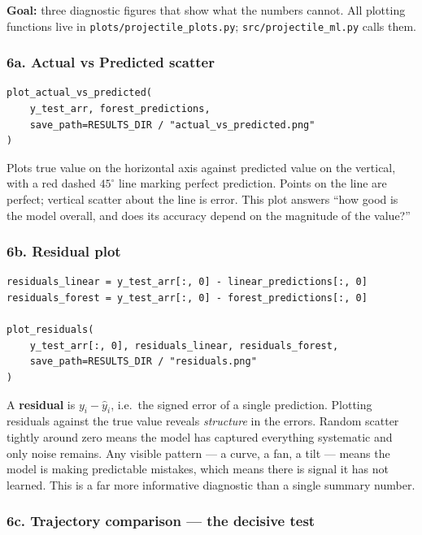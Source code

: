 \documentclass[11pt,a4paper]{article}
\begin{document}
\textbf{Goal:} three diagnostic figures that show what the numbers cannot. All plotting functions
live in \texttt{plots/projectile\_plots.py}; \texttt{src/projectile\_ml.py} calls them.

\subsubsection*{6a. Actual vs Predicted scatter}

\begin{lstlisting}[numbers=none]
plot_actual_vs_predicted(
    y_test_arr, forest_predictions,
    save_path=RESULTS_DIR / "actual_vs_predicted.png"
)
\end{lstlisting}

Plots true value on the horizontal axis against predicted value on the vertical, with a red dashed
$45^\circ$ line marking perfect prediction. Points on the line are perfect; vertical scatter about
the line is error. This plot answers ``how good is the model overall, and does its accuracy depend
on the magnitude of the value?''

\subsubsection*{6b. Residual plot}

\begin{lstlisting}[numbers=none]
residuals_linear = y_test_arr[:, 0] - linear_predictions[:, 0]
residuals_forest = y_test_arr[:, 0] - forest_predictions[:, 0]

plot_residuals(
    y_test_arr[:, 0], residuals_linear, residuals_forest,
    save_path=RESULTS_DIR / "residuals.png"
)
\end{lstlisting}

A \textbf{residual} is $y_{i}-\hat{y}_{i}$, i.e.\ the signed error of a single prediction. Plotting
residuals against the true value reveals \emph{structure} in the errors. Random scatter tightly
around zero means the model has captured everything systematic and only noise remains. Any visible
pattern --- a curve, a fan, a tilt --- means the model is making predictable mistakes, which means
there is signal it has not learned. This is a far more informative diagnostic than a single summary
number.

\subsubsection*{6c. Trajectory comparison --- the decisive test}
\end{document}
